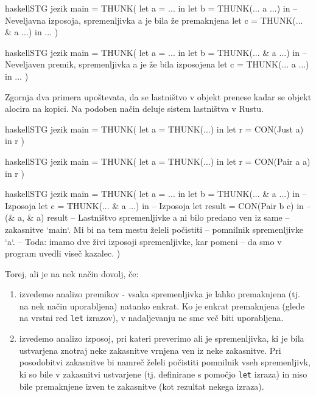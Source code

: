 \begin{code-box}{haskell}{STG jezik}
main = THUNK(
    let a = ... in
    let b = THUNK(... a ...) in
    -- Neveljavna izposoja, spremenljivka a je bila že premaknjena
    let c = THUNK(... & a ...) in 
        ...
)
\end{code-box}

\begin{code-box}{haskell}{STG jezik}
main = THUNK(
    let a = ... in
    let b = THUNK(... & a ...) in
    -- Neveljaven premik, spremenljivka a je že bila izposojena
    let c = THUNK(... a ...) in
        ...
)
\end{code-box}

Zgornja dva primera upoštevata, da se lastništvo v objekt prenese kadar se objekt alocira na kopici. Na podoben način deluje sistem lastništva v Rustu.

\begin{code-box}{haskell}{STG jezik \cmark}
main = THUNK(
    let a = THUNK(...) in
    let r = CON(Just a) in
        r
)
\end{code-box}

\begin{code-box}{haskell}{STG jezik \xmark}
main = THUNK(
    let a = THUNK(...) in
    let r = CON(Pair a a) in
        r
)
\end{code-box}

\begin{code-box}{haskell}{STG jezik}
main = THUNK(
    let a = ... in
    let b = THUNK(... & a ...) in -- Izposoja
    let c = THUNK(... & a ...) in -- Izposoja
    let result = CON(Pair b c) in -- (& a, & a)
        result
        -- Lastništvo spremenljivke a ni bilo predano ven iz same
        -- zakasnitve `main`. Mi bi na tem mestu želeli počistiti
        -- pomnilnik spremenljivke `a`.
        -- Toda: imamo dve živi izposoji spremenljivke, kar pomeni
        -- da smo v program uvedli viseč kazalec.
)
\end{code-box}

Torej, ali je na nek način dovolj, če:

\begin{enumerate}
    \itemsep 0em
    \item izvedemo analizo premikov - vsaka spremenljivka je lahko premaknjena (tj. na nek način uporabljena) natanko enkrat. Ko je enkrat premaknjena (glede na vrstni red \texttt{let} izrazov), v nadaljevanju ne sme več biti uporabljena.
    \item izvedemo analizo izposoj, pri kateri preverimo ali je spremenljivka, ki je bila ustvarjena znotraj neke zakasnitve vrnjena ven iz neke zakasnitve. Pri posodobitvi zakasnitve bi namreč želeli počistiti pomnilnik vseh spremenljivk, ki so bile v zakasnitvi ustvarjene (tj. definirane s pomočjo \texttt{let} izraza) in niso bile premaknjene izven te zakasnitve (kot rezultat nekega izraza).
\end{enumerate}

